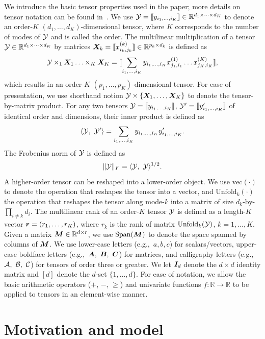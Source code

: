 \documentclass[12pt]{article}
\theoremstyle{plain}
\theoremstyle{definition}
\begin{document}
We introduce the basic tensor properties used in the paper; more details on tensor notation can be found in~\citet{kolda2009tensor}. We use $\mathcal{Y}=\llbracket y_{i_1,\ldots,i_K} \rrbracket\in \mathbb{R}^{d_1\times \cdots\times d_K}$ to denote an order-$K$ $(d_1,\ldots,d_K)$-dimensional tensor, where $K$ corresponds to the number of modes of $\mathcal{Y}$ and is called the order. The multilinear multiplication of a tensor $\mathcal{Y}\in\mathbb{R}^{d_1\times \cdots\times d_K}$ by matrices $\bm X_k=\llbracket x_{i_k,j_k}^{(k)} \rrbracket\in\mathbb{R}^{p_k\times d_k}$ is defined as
\begin{equation}
\mathcal{Y} \times_1\bm X_1\ldots \times_K \bm X_K=\llbracket \sum_{i_1,\ldots,i_K}y_{i_1,\ldots,i_K}x_{j_1,i_1}^{(1)}\ldots x_{j_K,i_K}^{(K)} \rrbracket,
\end{equation}
which results in an order-$K$ $(p_1,\ldots,p_K)$-dimensional tensor. For ease of presentation, we use shorthand notion $\mathcal{Y}\times\{\bm X_1,\ldots,\bm X_K\}$ to denote the tensor-by-matrix product. For any two tensors $\mathcal{Y}=\llbracket y_{i_1,\ldots,i_K} \rrbracket$, $\mathcal{Y}'=\llbracket y'_{i_1,\ldots,i_K} \rrbracket$ of identical order and dimensions, their inner product is defined as 
\[
\langle \mathcal{Y},\ \mathcal{Y}'\rangle =\sum_{i_1,\ldots,i_K}y_{i_1,\ldots,i_K}y'_{i_1,\ldots,i_K}.
\] 
The Frobenius norm of $\mathcal{Y}$ is defined as 
\[
\lVert\mathcal{Y}\rVert_F=\langle \mathcal{Y},\ \mathcal{Y} \rangle^{1/2}.
\]
A higher-order tensor can be reshaped into a lower-order object. We use $\text{vec}(\cdot)$ to denote the operation that reshapes the tensor into a vector, and $\text{Unfold}_k(\cdot)$ the operation that reshapes the tensor along mode-$k$ into a matrix of size $d_k$-by-$\prod_{i\neq k}d_i$. The multilinear rank of an order-$K$ tensor $\mathcal{Y}$ is defined as a length-$K$ vector $\bm{r}=(r_1,\ldots,r_K)$, where $r_k$ is the rank of matrix $\text{Unfold}_k(\mathcal{Y})$, $k=1,\ldots,K$. Given a matrix $\bm M\in\mathbb{R}^{d\times r}$, we use $\text{Span}(\bm M)$ to denote the space spanned by columns of $\bm M$. We use lower-case letters (e.g.,\ $a,b,c$) for scalars/vectors, upper-case boldface letters (e.g.,\ $\bm A,\ \bm B,\ \bm C$) for matrices, and calligraphy letters (e.g.,\ $\tA,\ \tB, \ \tC$) for tensors of order three or greater. We let $\bm I_d$ denote the $d \times d$ identity matrix and $[d]$ denote the $d$-set $\{1,\ldots,d\}$. For ease of notation, we allow the basic arithmetic operators ($+$, $-$, $\geq $) and univariate 
functions $f\colon \mathbb{R}\to \mathbb{R}$ to be applied to tensors in an element-wise manner.

\section{Motivation and model}\label{sec:model}
\end{document}
